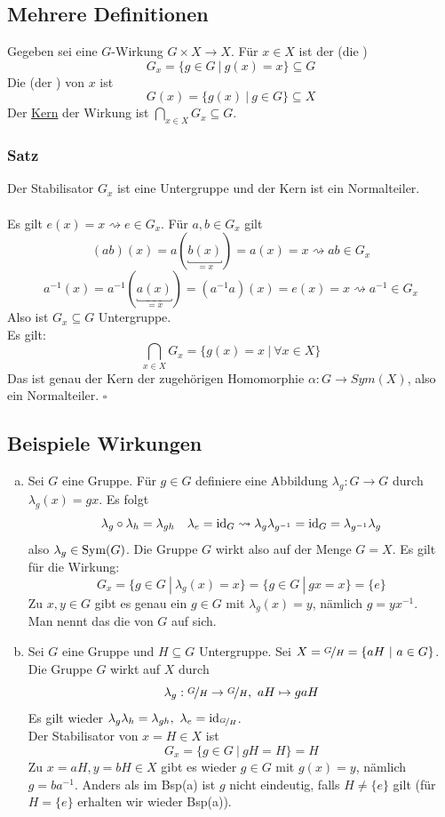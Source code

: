 \subsection{Mehrere Definitionen}
\label{sub:mehrere_def}
Gegeben sei eine $G$-Wirkung $G\times X\to X$. Für $x\in X$ ist der  (die )
\[G_x=\{g\in G~|~g(x)=x \}\subseteq G \]
Die  (der ) von $x$ ist 
\[G(x)=\{g(x)~|~g\in G \}\subseteq X \]
Der \uline{Kern} der Wirkung ist $\bigcap\limits_{x\in X}G_x\subseteq G$.

\subsubsection*{Satz}
Der Stabilisator $G_x$ ist eine Untergruppe und der Kern ist ein Normalteiler.\\

\\
Es gilt $e(x)=x \rightsquigarrow e\in G_x$. Für $a,b\in G_x$ gilt \[(ab)(x)=a(\underbracket{b(x)}_{=x})=a(x)=x \rightsquigarrow ab\in G_x\]
\[a^{-1}(x)=a^{-1}(\underbracket{a(x)}_{=x})=(a^{-1}a)(x)=e(x)=x \rightsquigarrow a^{-1}\in G_x \]
Also ist $G_x\subseteq G$ Untergruppe.\\
Es gilt: \[\bigcap\limits_{x\in X}G_x=\{g(x)=x~|~\forall x\in X \} \]
Das ist genau der Kern der zugehörigen Homomorphie $\alpha:G\to Sym(X)$, also ein Normalteiler.
\hfill $\square$

\subsection{Beispiele Wirkungen}
\label{sub:bsp_wirkungen}
\begin{enumerate}[(a)]
	\item Sei $G$ eine Gruppe. Für $g\in G$ definiere eine Abbildung $\lambda_g:G\to G$ durch $\lambda_g(x)=gx$. Es folgt
	\[\lambda_g\circ\lambda_h=\lambda_{gh} \quad \lambda_e=\operatorname{id}_G \rightsquigarrow \lambda_g\lambda_{g^{-1}}=\operatorname{id}_G=\lambda_{g^{-1}}\lambda_g \]
	also $\lambda_g\in \operatorname{Sym}(G)$. Die Gruppe $G$ wirkt also auf der Menge $G=X$. Es gilt für die Wirkung:
	\[G_x=\{g\in G~|~\lambda_g(x)=x \}=\{g\in G~|~gx=x \}=\{e\} \]
	Zu $x,y\in G$ gibt es genau ein $g\in G$ mit $\lambda_g(x)=y$, nämlich $g=yx^{-1}$.\\
	Man nennt das die  von $G$ auf sich.
	\item Sei $G$ eine Gruppe und $H\subseteq G$ Untergruppe. Sei $X=\nicefrac{G}{H}=\{aH~|~a\in G \}$. Die Gruppe $G$ wirkt auf $X$ durch \[\lambda_g:\nicefrac{G}{H}\to \nicefrac{G}{H},~aH\mapsto gaH \]
	Es gilt wieder $\lambda_g\lambda_h=\lambda_{gh},~\lambda_e=\operatorname{id}_{\nicefrac{G}{H}}$.\\
	Der Stabilisator von $x=H\in X$ ist \[G_x=\{g\in G~|~gH=H \}=H \]
	Zu $x=aH,y=bH\in X$ gibt es wieder $g\in G$ mit $g(x)=y$, nämlich $g=ba^{-1}$. Anders als im Bsp(a) ist $g$ nicht eindeutig, falls $H\not= \{e\}$ gilt (für $H=\{e\}$ erhalten wir wieder Bsp(a)). 
\end{enumerate}

